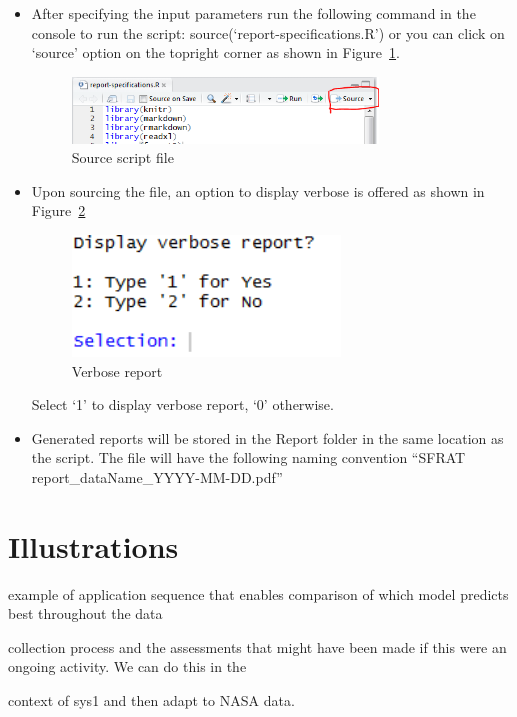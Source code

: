 \documentclass[journal]{IEEEtran}
\begin{document}
\begin{itemize}
  \item{After specifying the input parameters run the following command in the console to run the script: source(‘report-specifications.R’) or you can click on ‘source’ option on the topright corner as shown in Figure~\ref{fig:scriptsource}.
        \begin{figure}[!h]
        \centering
        \includegraphics[width=3.2in]{Figures/scriptsource}
        \caption{Source script file}
        \label{fig:scriptsource}
        \end{figure}
  }
  
  \item{Upon sourcing the file, an option to display verbose is offered as shown in Figure~\ref{fig:verbose}
        \begin{figure}[!h]
        \centering
        \includegraphics[width=2.8in]{Figures/verbose}
        \caption{Verbose report}
        \label{fig:verbose}
        \end{figure}  
       
  \noindent Select ‘1’ to display verbose report, `0' otherwise. 
  }
  \item {Generated reports will be stored in the Report folder in the same location as the script. The file will have the following naming convention ``SFRAT report\_dataName\_YYYY-MM-DD.pdf''}
\end{itemize}


\section{Illustrations}\label{sec:Ex}

example of application sequence that enables comparison of which model predicts best throughout the data

collection process and the assessments that might have been made if this were an ongoing activity. We can do this in the

context of sys1 and then adapt to NASA data.
\end{document}
